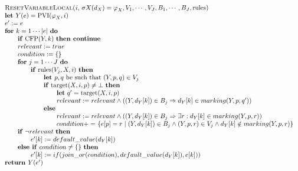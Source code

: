 \begin{equation*}
\begin{tabular}{l}
\textsc{ResetVariableLocal(}$i,$ $\sigma X(d_{X})=\varphi _{X},V_{1},\cdots
,V_{J},B_{1},\cdots ,B_{J},\mathrm{rules}$\textsc{)} \\ 
\textbf{let }$Y(e)=\mathrm{PVI}(\varphi _{X},i)$ \\ 
$e^{\prime }:=e$ \\ 
\textbf{for} $k=1\cdots \left\vert e\right\vert $ \textbf{do} \\ 
$\qquad $\textbf{if} $\mathrm{CFP}(Y,k)$ \textbf{then continue} \\ 
$\qquad relevant:=true$ \\ 
$\qquad condition:=\{\}$ \\ 
$\qquad $\textbf{for} $j=1\cdots J$ \textbf{do} \\ 
$\qquad \qquad $\textbf{if} $\mathrm{rules}(V_{j},X,i)$ \textbf{then} \\ 
$\qquad \qquad \qquad $\textbf{let }$p,q$ be such that $(Y,p,q)\in V_{j}$ \\ 
$\qquad \qquad \qquad $\textbf{if} $\mathrm{target}(X,i,p)\neq \bot $ 
\textbf{then} \\ 
$\qquad \qquad \qquad \qquad $\textbf{let} $q^{\prime }=\mathrm{target}%
(X,i,p)$ \\ 
$\qquad \qquad \qquad \qquad relevant:=relevant\wedge \left( \left(
Y,d_{Y}[k]\right) \in B_{j}\Rightarrow d_{Y}[k]\in marking(Y,p,q^{\prime
})\right) $ \\ 
$\qquad \qquad \qquad $\textbf{else} \\ 
$\qquad \qquad \qquad \qquad relevant:=relevant\wedge (\left(
Y,d_{Y}[k]\right) \in B_{j}\Rightarrow \exists r:d_{Y}[k]\in marking(Y,p,r))$
\\ 
$\qquad \qquad \qquad \qquad condition+=$ $\{e[p]=r\mid \left(
Y,d_{Y}[k]\right) \in B_{j}\wedge (Y,p,r)\in V_{j}\wedge d_{Y}[k]\notin
marking(Y,p,r)\}$ \\ 
$\qquad $\textbf{if} $\lnot relevant$ \textbf{then} \\ 
$\qquad \qquad e^{\prime }[k]:=default\_value(d_{Y}[k])$ \\ 
$\qquad $\textbf{else if} $condition\neq \{\}$ \textbf{then} \\ 
$\qquad \qquad e^{\prime
}[k]:=if(join\_or(condition),default\_value(d_{Y}[k]),e[k]))$ \\ 
\textbf{return }$Y(e^{\prime })$%
\end{tabular}%
\end{equation*}%
\newpage
